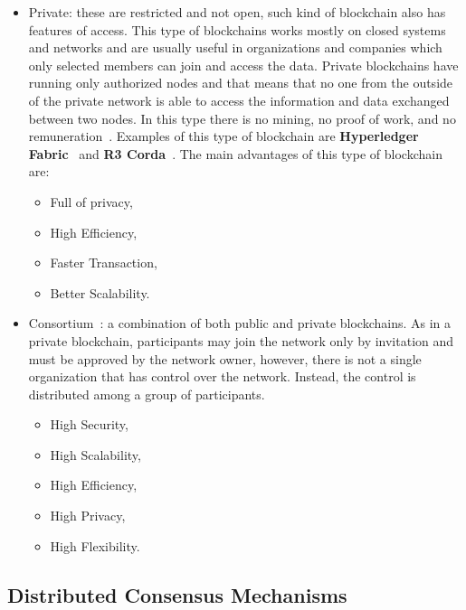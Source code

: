 \begin{itemize}
    \item {Private}: these are restricted and not open, such kind of blockchain also has features of access. This type of blockchains works mostly on closed systems and networks and are usually
          useful in organizations and companies which only selected members can join and access the data. Private blockchains have running only authorized nodes and that means that no one from the outside
          of the private network is able to access the information and data exchanged between two nodes. In this type there is no mining, no proof of work, and no remuneration~\cite{guegan:halshs-01524440}.
          Examples of this type of blockchain are \textbf{Hyperledger Fabric}~\cite{hyperLedger} and \textbf{R3 Corda}~\cite{r3Corda}.
          The main advantages of this type of blockchain are:
          \begin{itemize}
              \item Full of privacy,
              \item High Efficiency,
              \item Faster Transaction,
              \item Better Scalability.
          \end{itemize}
    \item {Consortium~\cite{KASI20221}}: a combination of both public and private blockchains. As in a private blockchain, participants may join the network only by invitation and must be approved by the network owner, however,
          there is not a single organization that has control over the network. Instead, the control is distributed among a group of participants.
          \begin{itemize}
              \item High Security,
              \item High Scalability,
              \item High Efficiency,
              \item High Privacy,
              \item High Flexibility.
          \end{itemize}

\end{itemize}

\subsection*{Distributed Consensus Mechanisms}\label{subsec:distributed-consensus-mechanisms}
